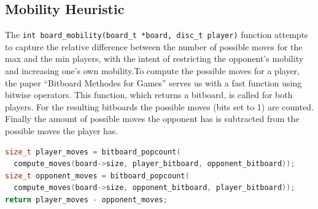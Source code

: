 \subsection{Mobility Heuristic}
The \verb|int board_mobility(board_t *board, disc_t player)| function attempts to capture the relative difference between the number of possible moves for the max and the min players, with the intent of restricting the opponent’s mobility and increasing one’s own mobility.\newline To compute the possible moves for a player, the paper “Bitboard Methodes for Games” \cite{quteprints85005} serves us with a fast function using bitwise operators. This function, which returns a bitboard, is called for both players. For the resulting bitboards the possible moves (bits set to 1) are counted. Finally the amount of possible moves the opponent has is subtracted from the possible moves the player has. 
\begin{lstlisting}[language=c]
size_t player_moves = bitboard_popcount(
  compute_moves(board->size, player_bitboard, opponent_bitboard));
size_t opponent_moves = bitboard_popcount(
  compute_moves(board->size, opponent_bitboard, player_bitboard));
return player_moves - opponent_moves;
\end{lstlisting}
